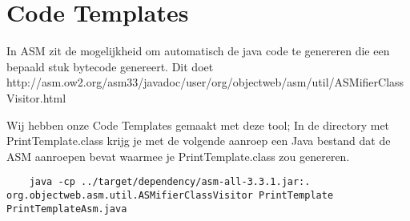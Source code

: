 \section{Code Templates}
In ASM zit de mogelijkheid om automatisch de java code te genereren die een bepaald stuk bytecode genereert.
Dit doet http://asm.ow2.org/asm33/javadoc/user/org/objectweb/asm/util/ASMifierClassVisitor.html

Wij hebben onze Code Templates gemaakt met deze tool; In de directory met PrintTemplate.class krijg je met de volgende aanroep een Java bestand dat de ASM aanroepen bevat waarmee je PrintTemplate.class zou genereren.
\begin{verbatim}
	java -cp ../target/dependency/asm-all-3.3.1.jar:. org.objectweb.asm.util.ASMifierClassVisitor PrintTemplate PrintTemplateAsm.java
\end{verbatim}
